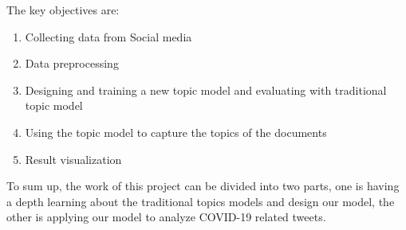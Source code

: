 The key objectives are:
\begin{enumerate}
    \item Collecting data from Social media
    \item Data preprocessing
    \item Designing and training a new topic model and evaluating with traditional topic model
    \item Using the topic model to capture the topics of the documents
    \item Result visualization
\end{enumerate}

To sum up, the work of this project can be divided into two parts, one is having a depth learning about the traditional topics models and design our model, the other is applying our model to analyze COVID-19 related tweets.
   